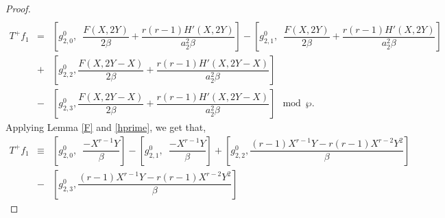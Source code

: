 \documentclass[11pt, reqno]{amsart}
\numberwithin{equation}{section}
\theoremstyle{definition}
\theoremstyle{remark}
\theoremstyle{definition}
\theoremstyle{remark}
\theoremstyle{remark}
\begin{document}
\begin{proof}
\begin{eqnarray}
 \end{eqnarray}
\begin{eqnarray*}
T^+f_{1}&=&  \left[g_{2,0}^0,\enspace \dfrac{F(X,2Y)}{2\beta}+\dfrac{r(r-1)H'(X,2Y)}{a_{2}^2\beta}\right] -\left[g_{2,1}^0,\enspace \dfrac{F(X,2Y)}{2\beta}+\dfrac{r(r-1)H'(X,2Y)}{a_{2}^2\beta}\right]\\
&+ &\left[g_{2,2}^0, \dfrac{F(X,2Y-X)}{2\beta}+\dfrac{r(r-1)H'(X,2Y-X)}{a_{2}^2\beta}\right] \\ 
&-&\left[g_{2,3}^0, \dfrac{F(X,2Y-X)}{2\beta}+\dfrac{r(r-1)H'(X,2Y-X)}{a_{2}^2\beta}\right]\mod\wp.
 \end{eqnarray*}
 Applying Lemma \ref{F} and \ref{hprime}, we get that,
 \begin{eqnarray}\label{T+f1}
 T^+f_{1} &\equiv& \left[g_{2,0}^0,\enspace \dfrac{-X^{r-1}Y}{\beta}\right] -\left[g_{2,1}^0,\enspace \dfrac{-X^{r-1}Y}{\beta}\right]
+ \left[g_{2,2}^0, \dfrac{(r-1)X^{r-1}Y-r(r-1)X^{r-2}Y^2}{\beta}\right] \nonumber \\
 &- &\left[g_{2,3}^0, \dfrac{(r-1)X^{r-1}Y-r(r-1)X^{r-2}Y^2}{\beta}\right]
\end{eqnarray}

\end{proof}
\end{document}
